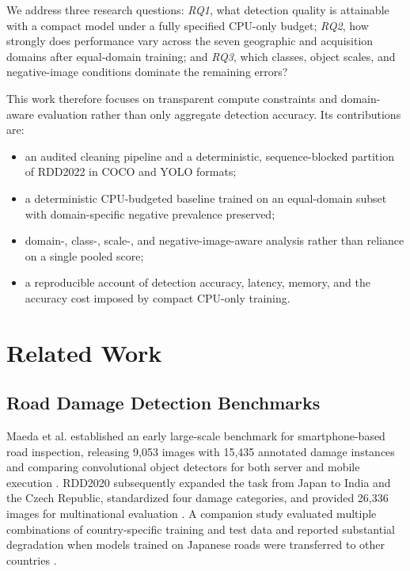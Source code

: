 \documentclass[conference]{ieee-template/vendor/IEEEtran/IEEEtran}
\begin{document}
We address three research questions: \emph{RQ1}, what detection quality is
attainable with a compact model under a fully specified CPU-only budget;
\emph{RQ2}, how strongly does performance vary across the seven geographic and
acquisition domains after equal-domain training; and \emph{RQ3}, which classes,
object scales, and negative-image conditions dominate the remaining errors?

This work therefore focuses on transparent compute constraints and domain-aware
evaluation rather than only aggregate detection accuracy. Its contributions are:
\begin{itemize}
    \item an audited cleaning pipeline and a deterministic, sequence-blocked
    partition of RDD2022 in COCO and YOLO formats;
    \item a deterministic CPU-budgeted baseline trained on an equal-domain
    subset with domain-specific negative prevalence preserved;
    \item domain-, class-, scale-, and negative-image-aware analysis rather
    than reliance on a single pooled score;
    \item a reproducible account of detection accuracy, latency, memory, and
    the accuracy cost imposed by compact CPU-only training.
\end{itemize}

\section{Related Work}
\label{sec:related-work}

\subsection{Road Damage Detection Benchmarks}
Maeda et al. established an early large-scale benchmark for smartphone-based
road inspection, releasing 9,053 images with 15,435 annotated damage instances
and comparing convolutional object detectors for both server and mobile
execution \cite{maeda2018road}. RDD2020 subsequently expanded the task from
Japan to India and the Czech Republic, standardized four damage categories,
and provided 26,336 images for multinational evaluation
\cite{arya2021rdd2020}. A companion study evaluated multiple combinations of
country-specific training and test data and reported substantial degradation
when models trained on Japanese roads were transferred to other countries
\cite{arya2021multiple}.
\end{document}
